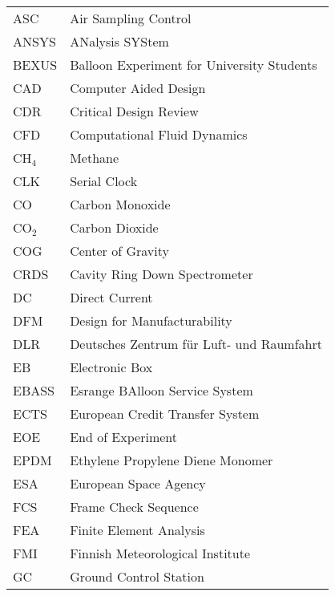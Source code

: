 
  
     \begin{longtable}{p{3cm} p{9cm}}
             ASC         & Air Sampling Control\\
             ANSYS       & ANalysis SYStem\\
             BEXUS       & Balloon Experiment for University Students\\
             CAD         & Computer Aided Design \\
             CDR         & Critical Design Review\\
             CFD         & Computational Fluid Dynamics\\
             CH$_{4}$    & Methane\\
             CLK         & Serial Clock\\
             CO          & Carbon Monoxide\\
             CO$_{2}$    & Carbon Dioxide\\
             COG         & Center of Gravity \\
             CRDS        & Cavity Ring Down Spectrometer\\
             DC          & Direct Current\\
             DFM         & Design for Manufacturability \\
             DLR         & Deutsches Zentrum f{\"u}r Luft- und Raumfahrt \\
             EB          & Electronic Box \\
             EBASS       & Esrange BAlloon Service System\\
             ECTS        & European Credit Transfer System\\
             EOE         & End of Experiment\\
             EPDM        & Ethylene Propylene Diene Monomer\\
             ESA         & European Space Agency \\
             FCS         & Frame Check Sequence\\
             FEA         & Finite Element Analysis\\
             FMI         & Finnish Meteorological Institute\\
             GC          & Ground Control Station\\

\end{longtable}
